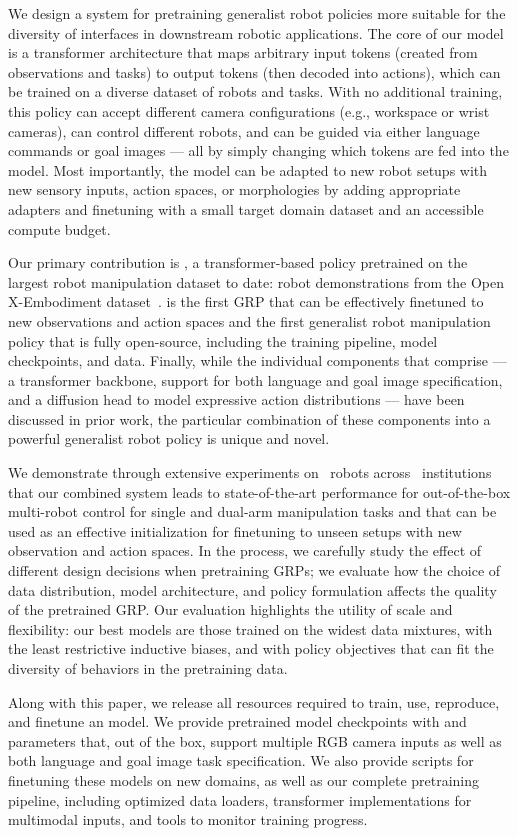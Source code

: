We design a system for pretraining generalist robot policies more suitable for the diversity of interfaces in downstream robotic applications. The core of our model is a transformer architecture that maps arbitrary input tokens (created from observations and tasks) to output tokens (then decoded into actions), which can be trained on a diverse dataset of robots and tasks. With no additional training, this policy can accept different camera configurations (e.g., workspace or wrist cameras), can control different robots, and can be guided via either language commands or goal images --- all by simply changing which tokens are fed into the model. Most importantly, the model can be adapted to new robot setups with new sensory inputs, action spaces, or morphologies by adding appropriate adapters and finetuning with a small target domain dataset and an accessible compute budget.

Our primary contribution is \methodfancy{}, a transformer-based policy pretrained on the largest robot manipulation dataset to date: \ntrajs{} robot demonstrations from the Open X-Embodiment dataset~\citep{open_x_embodiment_rt_x_2023}. \method{} is the first GRP that can be effectively finetuned to new observations and action spaces and the first generalist robot manipulation policy that is fully open-source, including the training pipeline, model checkpoints, and data. Finally, while the individual components that comprise \method{} --- a transformer backbone, support for both language and goal image specification, and a diffusion head to model expressive action distributions --- have been discussed in prior work, the particular combination of these components into a powerful generalist robot policy is unique and novel. 


We demonstrate through extensive experiments on \nsetups{}~robots across \ninstitutions{}~institutions that our combined system leads to state-of-the-art performance for out-of-the-box multi-robot control for single and dual-arm manipulation tasks and that \method{} can be used as an effective initialization for finetuning to unseen setups with new observation and action spaces. In the process, we carefully study the effect of different design decisions when pretraining GRPs; we evaluate how the choice of data distribution, model architecture, and policy formulation affects the quality of the pretrained GRP. Our evaluation highlights the utility of scale and flexibility: our best models are those trained on the widest data mixtures, with the least restrictive inductive biases, and with policy objectives that can fit the diversity of behaviors in the pretraining data.


Along with this paper, we release all resources required to train, use, reproduce, and finetune an \method{} model. We provide pretrained \method{} model checkpoints with \smallnparams{} and \largenparams{} parameters that, out of the box, support multiple RGB camera inputs as well as both language and goal image task specification. We also provide scripts for finetuning these models on new domains, as well as our complete pretraining pipeline, including optimized data loaders, transformer implementations for multimodal inputs, and tools to monitor training progress.




